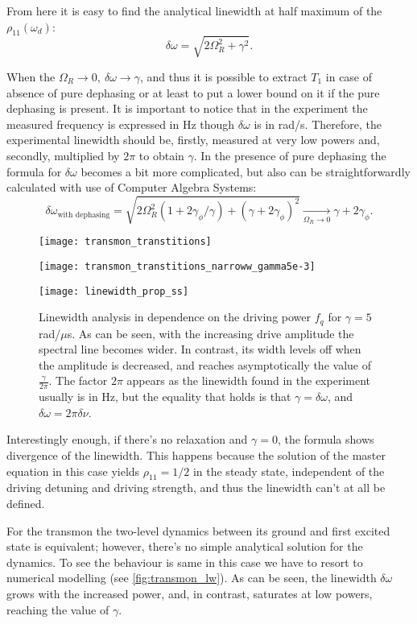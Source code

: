 \documentclass[12pt, twoside]{report}
\numberwithin{equation}{section}
\begin{document}
From here it is easy to find the analytical linewidth at half maximum of the $\rho_{11}(\omega_d)$:
\[
\delta\omega = \sqrt{2\Omega_R^2+\gamma^2}.
\]

When the $\Omega_R \rightarrow 0,\ \delta\omega\rightarrow\gamma$, and thus it is possible to extract $T_1$ in case of absence of pure dephasing or at least to put a lower bound on it if the pure dephasing is present. It is important to notice that in the experiment the measured frequency is expressed in Hz though $\delta\omega$ is in rad/s. Therefore, the experimental linewidth should be, firstly, measured at very low powers and, secondly, multiplied by $2\pi$ to obtain $\gamma$. In the presence of pure dephasing the formula for $\delta\omega$ becomes a bit more complicated, but also can be straightforwardly calculated with use of Computer Algebra Systems:
\[
\delta\omega_{\text{with dephasing}} = \sqrt{2Ω_{R}^{2} (1+2 γ_{ϕ}/\gamma) + (\gamma +2\gamma_\phi)^2} \xrightarrow[\Omega_R\rightarrow 0]{} γ + 2γ_{ϕ}.
\]


\begin{figure}[h!]
\centering
\texttt{[image: transmon\_transtitions]}

\texttt{[image: transmon\_transtitions\_narroww\_gamma5e-3]}

\texttt{[image: linewidth\_prop\_ss]}

\caption{Linewidth analysis in dependence on the driving power $f_q$ for $\gamma = 5$ rad/$\mu$s. As can be seen, with the increasing drive amplitude the spectral line becomes wider. In contrast, its width levels off when the amplitude is decreased, and reaches asymptotically the value of $\frac{\gamma}{2\pi}$. The factor $2\pi$ appears as the linewidth found in the experiment usually is in Hz, but the equality that holds is that $\gamma = \delta\omega$, and $\delta\omega = 2\pi\delta\nu$.}
\label{fig:transmon_lw}
\end{figure}  

Interestingly enough, if there's no relaxation and $\gamma = 0$, the formula shows divergence of the linewidth. This happens because the solution of the master equation in this case yields $\rho_{11} = 1/2$ in the steady state, independent of the driving detuning and driving strength, and thus the linewidth can't at all be defined.

For the transmon the two-level dynamics between its ground and first excited state is equivalent; however, there's no simple analytical solution for the dynamics. To see the behaviour is same in this case we have to resort to numerical modelling (see \autoref{fig:transmon_lw}).
As can be seen, the linewidth $\delta\omega$ grows with the increased power, and, in contrast, saturates at low powers, reaching the value of $\gamma$.
\end{document}
